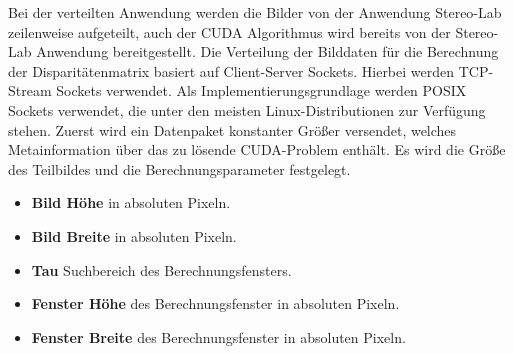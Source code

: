 \documentclass[conference]{IEEEtran}
\begin{document}
Bei der verteilten Anwendung werden die Bilder von der Anwendung Stereo-Lab zeilenweise aufgeteilt, auch der CUDA Algorithmus wird bereits von der Stereo-Lab Anwendung bereitgestellt. 
Die Verteilung der Bilddaten für die Berechnung der Disparitätenmatrix basiert auf Client-Server Sockets. 
Hierbei werden TCP-Stream Sockets verwendet. Als Implementierungsgrundlage werden POSIX Sockets verwendet, die unter den meisten Linux-Distributionen zur Verfügung stehen. %
Zuerst wird ein Datenpaket konstanter Größer versendet, welches Metainformation über das zu lösende CUDA-Problem enthält. Es wird die Größe des Teilbildes und die Berechnungsparameter festgelegt. 

\begin{itemize}
\item \textbf{Bild Höhe} in absoluten Pixeln.
\item \textbf{Bild Breite} in absoluten Pixeln.
\item \textbf{Tau} Suchbereich des Berechnungsfensters.
\item \textbf{Fenster Höhe} des Berechnungsfenster in absoluten Pixeln.
\item \textbf{Fenster Breite} des Berechnungsfenster in absoluten Pixeln.
\end{itemize}
\end{document}
